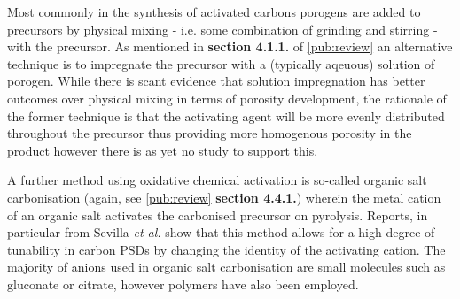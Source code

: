 Most commonly in the synthesis of activated carbons \glspl{porogen} are added to precursors by physical mixing - i.e. some combination of grinding and stirring - with the precursor.\citep{Aljumialy2020Porous, Blankenship2017Cigarette, Altwala2020Predictable, Sevilla2016Highly} As mentioned in \textbf{section 4.1.1.} of \ref{pub:review} an alternative technique is to impregnate the precursor with a (typically aqeuous) solution of \gls{porogen}.\citep{Botome2017Preparation, Ge2019Highly, Adlak2021Physicochemical, Shi2021Copper, Han2021Mulch} While there is scant evidence that solution impregnation has better outcomes over physical mixing in terms of porosity development, the rationale of the former technique is that the \gls{activating agent} will be more evenly distributed throughout the precursor thus providing more homogenous porosity in the product however there is as yet no study to support this. 

A further method using oxidative chemical activation is so-called organic salt carbonisation (again, see \ref{pub:review} \textbf{section 4.4.1.}) wherein the metal cation of an organic salt activates the carbonised precursor on pyrolysis. Reports, in particular from Sevilla \textit{et al.} show that this method allows for a high degree of tunability in carbon PSDs by changing the identity of the activating cation.\citep{Sevilla2013general, Tsumura2014Structure, Ferrero2015Mesoporous, Ferrero2016Efficient, Fuertes2015Hierarchical, Roberts2015Hierarchically, Yadav20123D, Yang2018Spontaneous} The majority of anions used in organic salt carbonisation are small molecules such as gluconate or citrate,\citep{Sevilla2013general, Yang2017Template, Sevilla2014Direct, Tsumura2014Structure, Ferrero2015Mesoporous, Ferrero2016Efficient, Fuertes2015Hierarchical, Yang2020Production, Fuertes2014One} however polymers have also been employed.\citep{Puthusseri20143D, Roberts2015Hierarchically, Yadav20123D, Hines2004Surface} 

